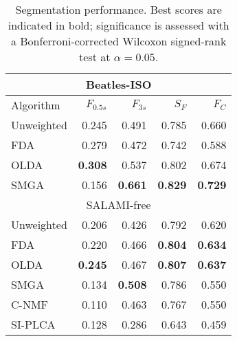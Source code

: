 \begin{table}
\centering
\caption{Segmentation performance. Best scores are indicated in bold; significance is assessed with a Bonferroni-corrected Wilcoxon
signed-rank test at $\alpha=0.05$.\label{tab:results}}
\begin{tabular}{lrrrr}
\multicolumn{5}{c}{Beatles-ISO}\\
\toprule%
Algorithm   & $F_{0.5s}$ & $F_{3s}$   & $S_F$ & $F_C$\\
\hline
Unweighted  & 0.245             & 0.491             & 0.785             & 0.660\\
FDA         & 0.279             & 0.472             & 0.742             & 0.588\\
OLDA        & \textbf{0.308}    & 0.537             & 0.802             & 0.674\\
\hline
SMGA~\hfill\cite{serra2012unsupervised} 
            & 0.156             & \textbf{0.661}    & \textbf{0.829}    & \textbf{0.729}\\
\toprule%
\multicolumn{5}{c}{SALAMI-free}\\
\toprule%
Unweighted  & 0.206             & 0.426             & 0.792             & 0.620\\
FDA         & 0.220             & 0.466             & \textbf{0.804}    & \textbf{0.634}\\
OLDA        & \textbf{0.245}    & 0.467             & \textbf{0.807}    & \textbf{0.637}\\
\hline
SMGA~\hfill\cite{serra2012unsupervised} 
            & 0.134             & \textbf{0.508}    & 0.786             & 0.550\\
C-NMF~\hfill\cite{nieto2013convex}  
            & 0.110             & 0.463             & 0.767             & 0.550\\
SI-PLCA~\hfill\cite{weiss2011unsupervised}  
            & 0.128             & 0.286             & 0.643             & 0.459\\
\bottomrule%
\end{tabular}
\end{table}
